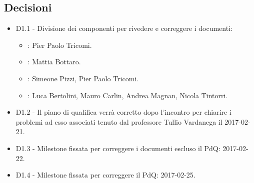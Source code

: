 \documentclass[a4paper,titlepage]{article}
\begin{document}
 \subsection{Decisioni}
 \begin{itemize}
  \item D1.1 - Divisione dei componenti per rivedere e correggere i documenti:
  	\begin{itemize}
  		\item \NPdocRR{}: Pier Paolo Tricomi.
  		\item \PPdocRR{}: Mattia Bottaro.
  		\item \PQdocRR{}: Simeone Pizzi, Pier Paolo Tricomi.
  		\item \ARdocRR{}: Luca Bertolini, Mauro Carlin, Andrea Magnan, Nicola Tintorri.
  	\end{itemize}
  \item D1.2 - Il piano di qualifica verrà corretto dopo l'incontro per chiarire i problemi ad esso associati tenuto dal professore Tullio Vardanega il 2017-02-21.
  \item D1.3 - Milestone fissata per correggere i documenti escluso il PdQ: 2017-02-22.
  \item D1.4 - Milestone fissata per correggere il PdQ: 2017-02-25.
 \end{itemize}
\end{document}
